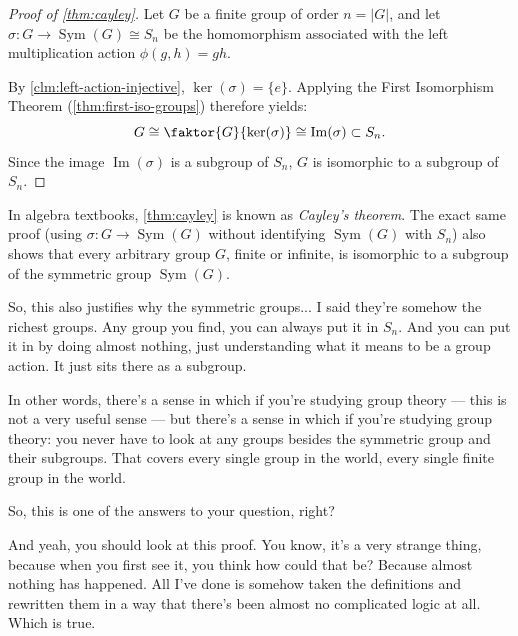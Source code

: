 \begin{content}

\begin{proof}[Proof of \cref{thm:cayley}]
Let $G$ be a finite group of order $n = |G|$, and let $\sigma \colon G \to \operatorname{Sym}(G) \cong S_n$ be the homomorphism associated with the left multiplication action $\phi(g, h) = gh$.

By \cref{clm:left-action-injective}, $\ker(\sigma) = \{e\}$. Applying the First Isomorphism Theorem (\cref{thm:first-iso-groups}) therefore yields:
\[
G \cong \faktor{G}{\ker(\sigma)} \cong \operatorname{Im}(\sigma) \subset S_n.
\]
Since the image $\operatorname{Im}(\sigma)$ is a subgroup of $S_n$, $G$ is isomorphic to a subgroup of $S_n$.
\end{proof}
\end{content}

\begin{aiNote}
In algebra textbooks, \cref{thm:cayley} is known as \emph{Cayley's theorem}. The exact same proof (using $\sigma \colon G \to \operatorname{Sym}(G)$ without identifying $\operatorname{Sym}(G)$ with $S_n$) also shows that every arbitrary group $G$, finite or infinite, is isomorphic to a subgroup of the symmetric group $\operatorname{Sym}(G)$.
\end{aiNote}

\begin{speech}[01:16:33 - 01:17:42]
So, this also justifies why the symmetric groups... I said they're somehow the richest groups. Any group you find, you can always put it in $S_n$. And you can put it in by doing almost nothing, just understanding what it means to be a group action. It just sits there as a subgroup.

In other words, there's a sense in which if you're studying group theory --- this is not a very useful sense --- but there's a sense in which if you're studying group theory: you never have to look at any groups besides the symmetric group and their subgroups. That covers every single group in the world, every single finite group in the world.

So, this is one of the answers to your question, right?

And yeah, you should look at this proof. You know, it's a very strange thing, because when you first see it, you think how could that be? Because almost nothing has happened. All I've done is somehow taken the definitions and rewritten them in a way that there's been almost no complicated logic at all. Which is true. 
\end{speech}


